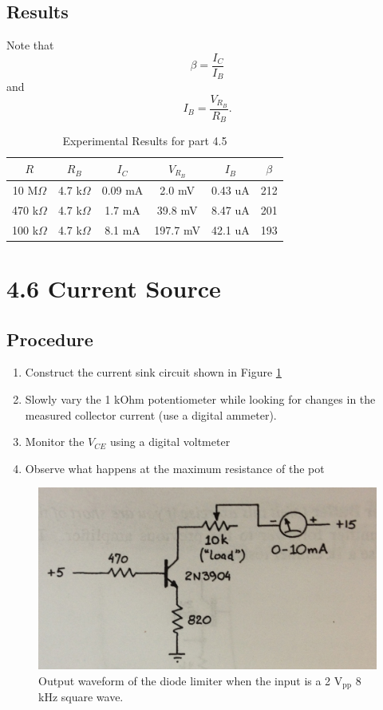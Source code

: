 \documentclass[12pt,letterpaper]{report}
\newlength \figwidth
\begin{document}
\subsection*{Results}
Note that 
$$
\beta = \frac{I_C}{I_B}
$$
and
$$
I_B = \frac{V_{R_B}}{R_B}.
$$

\begin{table}[ht]
\caption{Experimental Results for part 4.5} %
\centering 
    \begin{tabular}{| c | c | c | c | c | c |}
    \hline  
    $R$ & $R_B$ & $I_C$ & $V_{R_B}$ & $I_B$ & $\beta$\\
    \hline
    10 M$\Omega$  & 4.7 k$\Omega$ & 0.09 mA & 2.0 mV  & 0.43 uA & 212 \\
    470 k$\Omega$ & 4.7 k$\Omega$ & 1.7 mA & 39.8 mV  & 8.47 uA & 201 \\
    100 k$\Omega$ & 4.7 k$\Omega$ & 8.1 mA & 197.7 mV & 42.1 uA & 193 \\
    \hline
    \end{tabular}
    \label{table:4_5_results}
\end{table}

\section*{4.6 Current Source}
\subsection*{Procedure}

\begin{enumerate}
\item Construct the current sink circuit shown in Figure \ref{fig:4.6_circuit}
\item Slowly vary the 1 kOhm potentiometer while looking for changes in the measured collector current (use a digital ammeter).
\item Monitor the $V_{CE}$ using a digital voltmeter
\item Observe what happens at the maximum resistance of the pot
\end{enumerate}

\begin{figure}[H]
\centering
\includegraphics[width=\figwidth, keepaspectratio=true]{lab5/circuit.jpg}
\caption{Output waveform of the diode limiter when the input is a 2 $\text{V}_{\text{pp}}$ 8 kHz square wave.}
\label{fig:4.6_circuit}
\end{figure}
\end{document}
